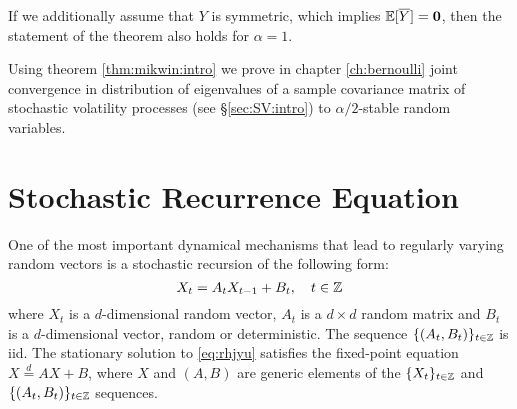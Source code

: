 \begin{remark}\label{rem:case:alpha:1:intro}
If we additionally assume that $Y$ is symmetric, which implies $\mathbb{E}[\overline
  Y]=\mathbf{0}$, then the statement of the theorem also holds for
$\alpha=1$.
\end{remark}

Using theorem \ref{thm:mikwin:intro} we prove in chapter
\ref{ch:bernoulli} joint convergence in distribution of eigenvalues of
a sample covariance matrix of stochastic volatility processes (see
\S\ref{sec:SV:intro}) to $\alpha/2$-stable random variables.


\section{Stochastic Recurrence Equation}
\label{sec:tyhyjyt}
One of the most important dynamical mechanisms that lead to regularly
varying random vectors is a stochastic recursion of the following form:
\begin{equation}
  \label{eq:rhjyu}
  X_t = A_t X_{t-1} + B_t, \quad t \in \mathbb Z
\end{equation}
where $X_t$ is a $d$-dimensional random vector, $A_t$ is a $d\times d$
random matrix and $B_t$ is a $d$-dimensional vector, random or
deterministic. The sequence $\{(A_t, B_t)\}_{t \in \mathbb Z}$ is
iid. The stationary solution to \eqref{eq:rhjyu} satisfies the fixed-point
equation $X \overset{d}{=} A X + B$, where $X$ and $(A, B)$ are
generic elements of the $\{X_t\}_{t \in \mathbb Z}$ and
$\{(A_t, B_t)\}_{t \in \mathbb Z}$ sequences.

